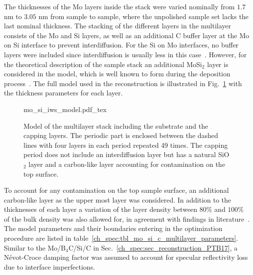 The thicknesses of the Mo layers inside the stack were varied nominally from $1.7$ nm to $3.05$ nm from sample to sample, where the unpolished sample set lacks the last nominal thickness. The stacking of the different layers in the multilayer consists of the Mo and Si layers, as well as an additional C buffer layer at the Mo on Si interface to prevent interdiffusion. For the Si on Mo interfaces, no buffer layers were included since interdiffusion is usually less in this case~\cite{petford-long_highresolution_1987}. However, for the theoretical description of the sample stack an additional MoSi$_2$ layer is considered in the model, which is well known to form during the deposition process~\cite{bajt_investigation_2001}. The full model used in the reconstruction is illustrated in Fig.~\ref{ch_spec:fig_model_unpolished_and_polished_samples} with the thickness parameters for each layer.
\begin{figure}[htbp]
    \def\svgwidth{0.7\textwidth}
    \selectfont\footnotesize
    {mo_si_iws_model.pdf_tex}
    \caption[Model of the Mo/Si/C multilayer stack including the substrate and the capping layers.]{Model of the multilayer stack including the substrate and the capping layers. The periodic part is enclosed between the dashed lines with four layers in each period repeated 49 times. The capping period does not include an interdiffusion layer but has a natural SiO$_2$ layer and a carbon-like layer accounting for contamination on the top surface.}
    \label{ch_spec:fig_model_unpolished_and_polished_samples}
\end{figure}
To account for any contamination on the top sample surface, an additional carbon-like layer as the upper most layer was considered. In addition to the thicknesses of each layer a variation of the layer density between $80\%$ and $100\%$ of the bulk density was also allowed for, in agreement with findings in literature~\cite{braun_mo/si_2002}. The model parameters and their boundaries entering in the optimization procedure are listed in table~\ref{ch_spec:tbl_mo_si_c_multilayer_parameters}. Similar to the Mo/B$_4$C/Si/C in Sec.~\ref{ch_spec:sec_reconstruction_PTB17}, a N\'{e}vot-Croce damping factor was assumed to account for specular reflectivity loss due to interface imperfections. 
